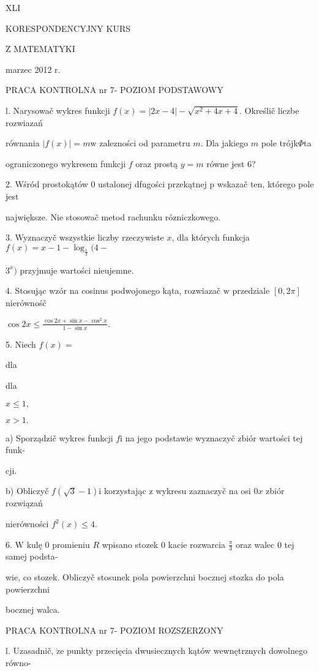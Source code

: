 \documentclass[a4paper,12pt]{article}
\begin{document}
XLI

KORESPONDENCYJNY KURS

Z MATEMATYKI

marzec 2012 r.

PRACA KONTROLNA nr 7- POZIOM PODSTAWOWY

l. Narysowač wykres funkcji $f(x) = |2x-4|-\sqrt{x^{2}+4x+4}$. Określič liczbe rozwiazań

równania $|f(x)| = m \mathrm{w}$ zalezności od parametru $m$. Dla jakiego $m$ pole trójk$\Phi$ta

ograniczonego wykresem funkcji $f$ oraz prostą $y=m$ równe jest 6?

2. Wśród prostokątów 0 ustalonej dfugości przekątnej p wskazač ten, którego pole jest

największe. Nie stosowač metod rachunku rózniczkowego.

3. Wyznaczyč wszystkie liczby rzeczywiste $x$, dla których funkcja $f(x)=x-1-\log_{\frac{1}{3}}(4-$

$3^{x})$ przyjmuje wartości nieujemne.

4. Stosując wzór na cosinus podwojonego kąta, rozwiazač $\mathrm{w}$ przedziale $[0,2\pi]$ nierównośč

$\displaystyle \cos 2x\leq\frac{\cos 2x+\sin x-\cos^{2}x}{1-\sin x}.$

5. Niech $f(x)=$

dla

dla

$x\leq 1,$

$x>1.$

a) Sporządzič wykres funkcji $f\mathrm{i}$ na jego podstawie wyznaczyč zbiór wartości tej funk-

cji.

b) Obliczyč $f(\sqrt{3}-1) \mathrm{i}$ korzystając $\mathrm{z}$ wykresu zaznaczyč na osi $0x$ zbiór rozwiązań

nierówności $f^{2}(x)\leq 4.$

6. $\mathrm{W}$ kulę $0$ promieniu $R$ wpisano stozek $0$ kacie rozwarcia $\displaystyle \frac{\pi}{3}$ oraz walec $0$ tej samej podsta-

wie, co stozek. Obliczyč stosunek pola powierzchni bocznej stozka do pola powierzchni

bocznej walca.





PRACA KONTROLNA nr 7- POZIOM ROZSZERZONY

l. Uzasadnič, $\dot{\mathrm{z}}\mathrm{e}$ punkty przecięcia dwusiecznych kątów wewnętrznych dowolnego równo-
\end{document}
